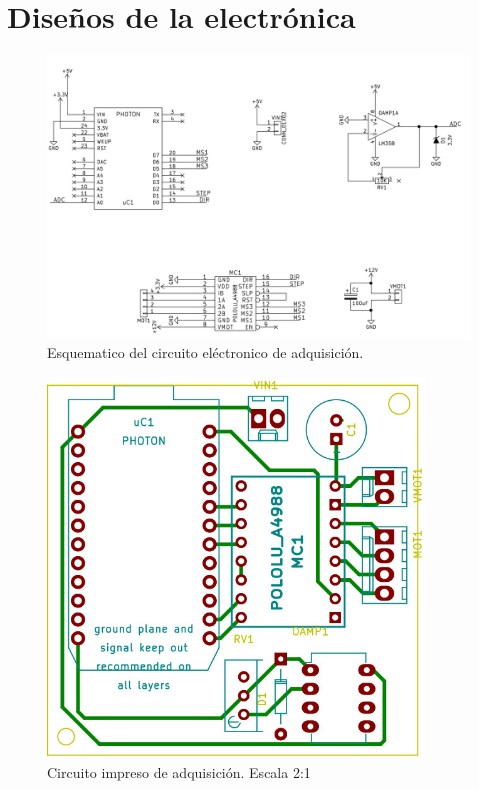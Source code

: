\documentclass[12pt,a4paper]{article}
\begin{document}
    \clearpage
    \section{Diseños de la electrónica}
    \vfill
    \begin{figure}[H]
    \centering
    \includegraphics[width=15cm]{fig/circuito/circuito_esquematico}
    \caption{Esquematico del circuito eléctronico de adquisición.}
    \label{fig:circuito/esquematico}
    \end{figure}
    \vfill
    \begin{figure}[H]
    \centering
    \includegraphics[width=10cm]{fig/circuito/circuito_pcb}
    \caption{Circuito impreso de adquisición. Escala 2:1}
    \label{fig:circuito/pcb}
    \end{figure}
    \vfill
\end{document}
